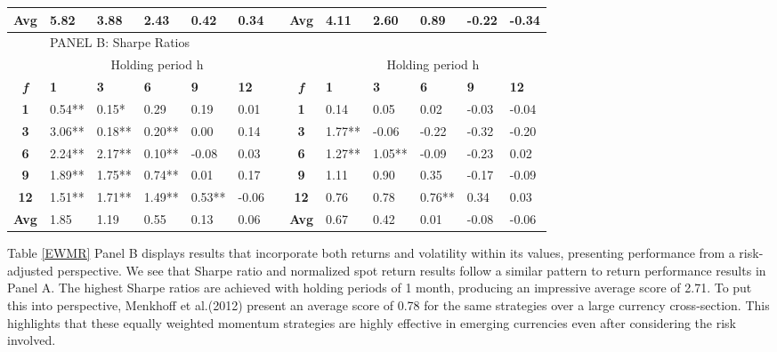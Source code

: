 \documentclass{article}
\begin{document}
\begin{table}[t!]
\begin{adjustwidth}{-1cm}{}
\begin{tabular}{clllllrclllll}
\cmidrule{2-6}\cmidrule{9-13}    \textbf{Avg} & 5.82  & 3.88  & 2.43  & 0.42  & 0.34  &       & \textbf{Avg} & 4.11  & 2.60 & 0.89  & -0.22 & -0.34 \\
    \midrule
          & \multicolumn{12}{l}{PANEL B: Sharpe Ratios} \\
    \midrule
          & \multicolumn{5}{c}{Holding period h}  &       &       & \multicolumn{5}{c}{Holding period h} \\
    \textit{\textbf{f}} & \textbf{1} & \textbf{3} & \textbf{6} & \textbf{9} & \textbf{12} &       & \textit{\textbf{f}} & \textbf{1} & \textbf{3} & \textbf{6} & \textbf{9} & \textbf{12} \\
\cmidrule{2-6}\cmidrule{9-13}    \textbf{1} & 0.54** & 0.15* & 0.29  & 0.19  & 0.01  &       & \textbf{1} & 0.14  & 0.05  & 0.02  & -0.03 & -0.04 \\
    \textbf{3} & 3.06** & 0.18** & 0.20** & 0.00  & 0.14  &       & \textbf{3} & 1.77** & -0.06 & -0.22 & -0.32 & -0.20 \\
    \textbf{6} & 2.24** & 2.17** & 0.10** & -0.08 & 0.03  &       & \textbf{6} & 1.27** & 1.05** & -0.09 & -0.23 & 0.02 \\
    \textbf{9} & 1.89** & 1.75** & 0.74** & 0.01  & 0.17  &       & \textbf{9} & 1.11  & 0.90  & 0.35  & -0.17 & -0.09 \\
    \textbf{12} & 1.51** & 1.71** & 1.49** & 0.53** & -0.06 &       & \textbf{12} & 0.76  & 0.78  & 0.76** & 0.34  & 0.03 \\
\cmidrule{2-6}\cmidrule{9-13}    \textbf{Avg} & 1.85  & 1.19  & 0.55  & 0.13  & 0.06  &       & \textbf{Avg} & 0.67  & 0.42  & 0.01  & -0.08 & -0.06 \\
    \bottomrule
    \end{tabular}%
  \label{HLMR}%
  \end{adjustwidth}
\end{table}%


Table \ref{EWMR} Panel B displays results that incorporate both returns and volatility within its values, presenting performance from a risk-adjusted perspective. We see that Sharpe ratio and normalized spot return results follow a similar pattern to return performance results in Panel A. The highest Sharpe ratios are achieved with holding periods of 1 month, producing an impressive average score of 2.71. To put this into perspective, Menkhoff et al.(2012) present an average score of 0.78 for the same strategies over a large currency cross-section. This highlights that these equally weighted momentum strategies are highly effective in emerging currencies even after considering the risk involved.\\
\end{document}

